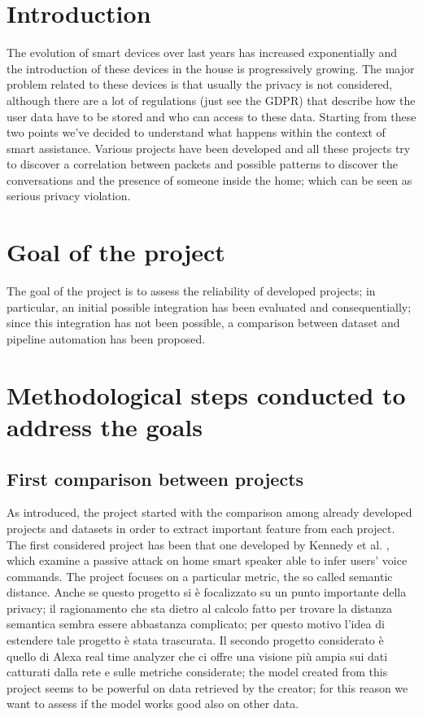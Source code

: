 \documentclass[sigconf]{acmart}
\begin{document}
    \section{Introduction}
    The evolution of smart devices over last years has increased exponentially and the introduction of these devices in the house is progressively growing.
    The major problem related to these devices is that usually the privacy is not considered, although there are a lot of regulations (just see the GDPR) that describe how the user data have to be stored and who can access to these data.
    Starting from these two points we've decided to understand what happens within the context of smart assistance.
    Various projects have been developed and all these projects try to discover a correlation between packets and possible patterns to discover the conversations and the presence of someone inside the home; which can be seen as serious privacy violation. 

\section{Goal of the project}
The goal of the project is to assess the reliability of developed projects; in particular, an initial possible integration has been evaluated and consequentially; since this integration has not been possible, a comparison between dataset and pipeline automation has been proposed. 

\section{Methodological steps conducted to address the goals}
\subsection{First comparison between projects}
As introduced, the project started with the comparison among already developed projects and datasets in order to extract important feature from each project. The first considered project has been that one developed by Kennedy et al. \cite{Kennedy}, which examine a passive attack on home smart speaker able to infer users' voice commands. The project focuses on a particular metric, the so called semantic distance. Anche se questo progetto si è focalizzato su un punto importante della privacy; il ragionamento che sta dietro al calcolo fatto per trovare la distanza semantica sembra essere abbastanza complicato; per questo motivo l'idea di estendere tale progetto è stata trascurata. Il secondo progetto considerato è quello di Alexa real time analyzer che ci offre una visione più ampia sui dati catturati dalla rete e sulle metriche considerate; the model created from this project seems to be powerful on data retrieved by the creator; for this reason we want to assess if the model works good also on other data.
\end{document}
